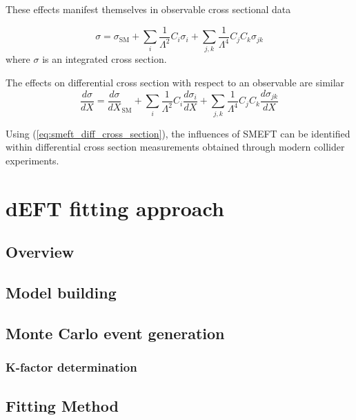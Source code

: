 \documentclass[a4paper]{article}
\begin{document}
These effects manifest themselves in observable cross sectional data \cite{Hartland_2019}

\begin{equation}\label{eq:smeft_cross_section}
    \sigma = \sigma_{\text{SM}} + \sum\limits_{i} \frac{1}{\Lambda^2} C_{i} \sigma_{i} + \sum\limits_{j,k} \frac{1}{\Lambda^4} C_{j} C_{k} \sigma_{j k}
\end{equation}
where $\sigma$ is an integrated cross section.

The effects on differential cross section with respect to an observable are similar
\begin{equation}\label{eq:smeft_diff_cross_section}
    \frac{d\sigma}{dX} = \frac{d\sigma}{dX}_{\text{SM}} + \sum\limits_{i} \frac{1}{\Lambda^2} C_{i} \frac{d\sigma_{i}}{dX} + \sum\limits_{j,k} \frac{1}{\Lambda^4} C_{j} C_{k} \frac{d\sigma_{j k}}{dX}
\end{equation}

Using (\ref{eq:smeft_diff_cross_section}), the influences of SMEFT can be identified within differential cross section measurements obtained through modern collider experiments.

\section{dEFT fitting approach}

\subsection{Overview}

\subsection{Model building}

\subsection{Monte Carlo event generation}

\subsubsection{K-factor determination}

\subsection{Fitting Method}
\end{document}
